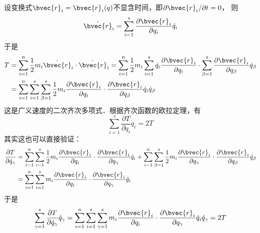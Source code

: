 设变换式$\bvec{r}_{i}=\bvec{r}_{i}(q)$不显含时间，即$\partial \bvec{r}_{i} / \partial t=0$， 则
\begin{equation}
\dot{\bvec{r}}_{i}=\sum_{i=1}^{s} \frac{\partial \bvec{r}_{i}}{\partial q_{i}} \dot{q}_{i}
\end{equation}
于是
\begin{equation}
\begin{aligned} T &=\sum_{i=1}^{n} \frac{1}{2} m_{i} \dot{\bvec{r}}_{i} \cdot \dot{\bvec{r}}_{i}=\sum_{i=1}^{n} \frac{1}{2} m_{i} \sum_{i=1}^{s} \dot{q}_{i} \frac{\partial \bvec{r}_{i}}{\partial q_{i}} \cdot \sum_{\beta=1}^{s} \frac{\partial \bvec{r}_{i}}{\partial q_{\beta}} \dot{q}_{\beta} \\ &=\sum_{i=1}^{n} \sum_{i=1}^{s} \sum_{\beta=1}^{s} \frac{1}{2} m_{i} \frac{\partial \bvec{r}_{i}}{\partial q_{i}} \cdot \frac{\partial \bvec{r}_{i}}{\partial q_{\beta}} \dot{q}_{i} \dot{q}_{\beta} \end{aligned}
\end{equation}
这是广义速度的二次齐次多项式．根据齐次函数的欧拉定理，有
\begin{equation} \label{motint_eq3}
\sum_{i=1}^{s} \frac{\partial T}{\partial \dot{q}_{i}} \dot{q}_{i}=2 T
\end{equation}
其实这也可以直接验证：
\begin{equation}
\begin{aligned} \frac{\partial T}{\partial \dot{q}_{\gamma}} &=\sum_{i=1}^{n} \sum_{i=1}^{s} \frac{1}{2} m_{i} \frac{\partial \bvec{r}_{i}}{\partial q_{i}} \cdot \frac{\partial \bvec{r}_{i}}{\partial q_{\gamma}} \dot{q}_{i}+\sum_{i=1}^{n} \sum_{\beta=1}^{s} \frac{1}{2} m_{i} \frac{\partial \bvec{r}_{i}}{\partial q_{\gamma}} \cdot \frac{\partial \bvec{r}_{i}}{\partial q_{\beta}} \dot{q}_{\beta} \\ &=\sum_{i=1}^{n} \sum_{i=1}^{s} m_{i} \frac{\partial \bvec{r}_{i}}{\partial q_{i}} \cdot \frac{\partial \bvec{r}_{i}}{\partial q_{\gamma}} \dot{q}_{i} \end{aligned}
\end{equation}
于是
\begin{equation}
\sum_{\gamma=1}^{s} \frac{\partial T}{\partial \dot{q}_{\gamma}} \dot{q}_{\gamma}=\sum_{i=1}^{n} \sum_{i=1}^{s} \sum_{\gamma=1}^{s} m_{i} \frac{\partial \bvec{r}_{i}}{\partial q_{i}} \cdot \frac{\partial \bvec{r}_{i}}{\partial q_{\gamma}} \dot{q}_{i} \dot{q}_{\gamma}=2 T
\end{equation}

